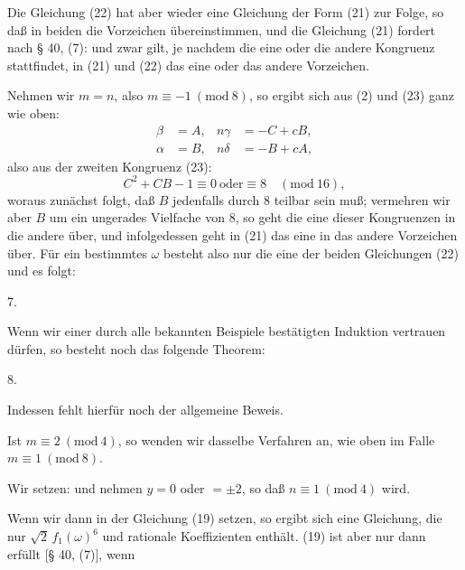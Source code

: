 
Die Gleichung (22) hat aber wieder eine Gleichung der Form (21) zur Folge, so daß in beiden die Vorzeichen übereinstimmen, und die Gleichung (21) fordert nach § 40, (7):
und zwar gilt, je nachdem die eine oder die andere Kongruenz stattfindet, in (21) und (22) das eine oder das andere Vorzeichen.

Nehmen wir $m = n$, also $m \equiv -1\ (\mathrm{mod}\ 8)$, so ergibt sich aus (2) und (23) ganz wie oben:
\[
\begin{aligned}
\beta &= A, & n\gamma &= -C + cB, \\
\alpha &= B, & n\delta &= -B + cA,
\end{aligned}
\]
also aus der zweiten Kongruenz (23):
\[
C^2 + CB - 1 \equiv 0 \ \text{oder} \equiv 8 \quad (\mathrm{mod}\ 16),
\]
woraus zunächst folgt, daß $B$ jedenfalls durch 8 teilbar sein muß; vermehren wir aber $B$ um ein ungerades Vielfache von 8, so geht die eine dieser Kongruenzen in die andere über, und infolgedessen geht in (21) das eine in das andere Vorzeichen über. Für ein bestimmtes $\omega$ besteht also nur die eine der beiden Gleichungen (22) und es folgt:

7. 

Wenn wir einer durch alle bekannten Beispiele bestätigten Induktion vertrauen dürfen, so besteht noch das folgende Theorem:

8. 

Indessen fehlt hierfür noch der allgemeine Beweis.

Ist $m \equiv 2\ (\mathrm{mod}\ 4)$, so wenden wir dasselbe Verfahren an, wie oben im Falle $m \equiv 1\ (\mathrm{mod}\ 8)$.

Wir setzen:
und nehmen $y = 0$ oder $= \pm 2$, so daß $n \equiv 1\ (\mathrm{mod}\ 4)$ wird. %

Wenn wir dann in der Gleichung (19)
setzen, so ergibt sich eine Gleichung, die nur $\sqrt{2}\, f_1(\omega)^6$ und rationale Koeffizienten enthält. (19) ist aber nur dann erfüllt [§ 40, (7)], wenn
